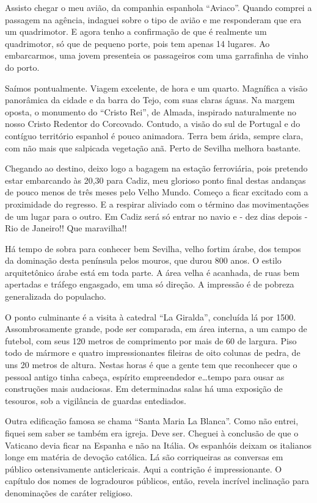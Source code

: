 Assisto chegar o meu avião, da companhia espanhola “Aviaco”. Quando comprei a passagem na agência, indaguei sobre o tipo de avião e me responderam que era um quadrimotor. E agora tenho a confirmação de que é realmente um quadrimotor, só que de pequeno porte, pois tem apenas 14 lugares. Ao embarcarmos, uma jovem presenteia os passageiros com uma garrafinha de vinho do porto.

Saímos pontualmente. Viagem excelente, de hora e um quarto. Magnífica a visão panorâmica da cidade e da barra do Tejo, com suas claras águas. Na margem oposta, o monumento do “Cristo Rei”, de Almada, inspirado naturalmente no nosso Cristo Redentor do Corcovado. Contudo, a visão do sul de Portugal e do contíguo território espanhol é pouco animadora. Terra bem árida, sempre clara, com não mais que salpicada vegetação anã. Perto de Sevilha melhora bastante.

Chegando ao destino, deixo logo a bagagem na estação ferroviária, pois pretendo estar embarcando às 20,30 para Cadiz, meu glorioso ponto final destas andanças de pouco menos de três meses pelo Velho Mundo. Começo a ficar excitado com a proximidade do regresso. E a respirar aliviado com o término das movimentações de um lugar para o outro. Em Cadiz será só entrar no navio e - dez dias depois - Rio de Janeiro!! Que maravilha!!

Há tempo de sobra para conhecer bem Sevilha, velho fortim árabe, dos tempos da dominação desta península pelos mouros, que durou 800 anos. O estilo arquitetônico árabe está em toda parte. A área velha é acanhada, de ruas bem apertadas e tráfego engasgado, em uma só direção. A impressão é de pobreza generalizada do populacho.

O ponto culminante é a visita à catedral “La Giralda”, concluída lá por 1500. Assombrosamente grande, pode ser comparada, em área interna, a um campo de futebol, com seus 120 metros de comprimento por mais de 60 de largura. Piso todo de mármore e quatro impressionantes fileiras de oito colunas de pedra, de uns 20 metros de altura. Nestas horas é que a gente tem que reconhecer que o pessoal antigo tinha cabeça, espírito empreendedor e\ldots tempo para ousar as construções mais audaciosas. Em determinadas salas há uma exposição de tesouros, sob a vigilância de guardas entediados.

Outra edificação famosa se chama “Santa Maria La Blanca”. Como não entrei, fiquei sem saber se também era igreja. Deve ser. Cheguei à conclusão de que o Vaticano devia ficar na Espanha e não na Itália. Os espanhóis deixam os italianos longe em matéria de devoção católica. Lá são corriqueiras as conversas em público ostensivamente anticlericais. Aqui a contrição é impressionante. O capítulo dos nomes de logradouros públicos, então, revela incrível inclinação para denominações de caráter religioso.

